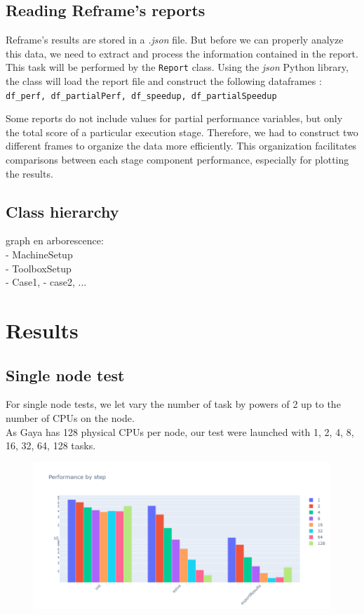 \documentclass[12pt]{article}
\begin{document}
\newpage
\subsection{Reading Reframe's reports}
Reframe's results are stored in a \textit{.json} file. But before we can properly analyze this data, we need to extract and process the information contained in the report.
This task will be performed by the \small{\texttt{Report}} class. Using the \textit{json} Python library, the class will load the report file and construct the following dataframes :
\texttt{df\_perf, df\_partialPerf, df\_speedup, df\_partialSpeedup}

Some reports do not include values for partial performance variables, but only the total score of a particular execution stage.
Therefore, we had to construct two different frames to organize the data more efficiently.
This organization facilitates comparisons between each stage component performance, especially for plotting the results.

\subsection{Class hierarchy}
graph en arborescence:\\
- MachineSetup \\
- ToolboxSetup \\
- Case1,   - case2,  ...
\section{Results}

\subsection{Single node test}
For single node tests, we let vary the number of task by powers of 2 up to the number of CPUs on the node. \\
As Gaya has 128 physical CPUs per node, our test were launched with 1, 2, 4, 8, 16, 32, 64, 128 tasks.

\begin{figure}[H]
    \centering
    \includegraphics[width=\textwidth]{../illustrations/case3_P2/perfByStep.png}
\end{figure}
\end{document}
